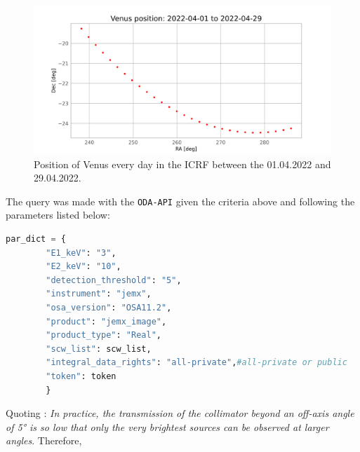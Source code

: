     \begin{figure}[H]
        \centering
        \includegraphics[width = 12cm]{report/Figures/methods/Venus_position.png}
        \caption{Position of Venus every day in the ICRF between the 01.04.2022 and 29.04.2022.}
        \label{venus_pos}
    \end{figure}

        The query was made with the \texttt{ODA-API} given the criteria above and following the parameters listed below:
        \begin{lstlisting}[language = Python,caption = Query parameters template used for both dates.,label = dict]
        par_dict = {
        "E1_keV": "3",
        "E2_keV": "10",
        "detection_threshold": "5",
        "instrument": "jemx",
        "osa_version": "OSA11.2",
        "product": "jemx_image",
        "product_type": "Real",
        "scw_list": scw_list,
        "integral_data_rights": "all-private",#all-private or public
        "token": token
        }
        \end{lstlisting}
        Quoting \cite{2020ISDCManual}: \textit{In practice, the transmission of the collimator beyond an off-axis angle of 5° is so low that only the very brightest sources can be observed at larger angles}. Therefore,

